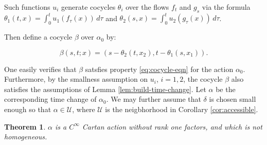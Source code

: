 \documentclass[12pt]{amsart}
\newtheorem{theorem}{Theorem}[section]
\theoremstyle{definition}
\theoremstyle{remark}
\numberwithin{equation}{section}
\newcommand{\mc}{\mathcal}
\newtheorem{Structural Stability Theorem}[theorem]{Structural Stability Theorem}
\begin{document}
Such functions $u_i$ generate cocycles $\theta_i$ over the flows $f_t$ and $g_s$ via the formula $\theta_1(t,x) = \int_0^t u_1(f_\tau(x)) \, d\tau$ and $\theta_2(s,x) = \int_0^t u_2(g_\tau(x)) \, d\tau$. 

Then define a cocycle $\beta$ over $\alpha_0$ by:

\[ \beta(s,t;x) = (s - \theta_2(t,x_2),t - \theta_1(s,x_1)). \]

One easily verifies that $\beta$ satsfies property \eqref{eq:cocycle-eqn} for the action $\alpha_0$. Furthermore, by the smallness assumption on $u_i$, $i = 1,2$, the cocycle $\beta$ also satisfies the assumptions of Lemma \ref{lem:build-time-change}. Let $\alpha$ be the corresponding time change of $\alpha_0$. We may further assume that $\delta$ is chosen small enough so that $\alpha \in \mc U$, where $\mc U$ is the neigbhorhood in Corollary \ref{cor:accessible}.

\begin{theorem}
$\alpha$ is a $C^\infty$ Cartan action without rank one factors, and which is not homogeneous.
\end{theorem}
\end{document}
